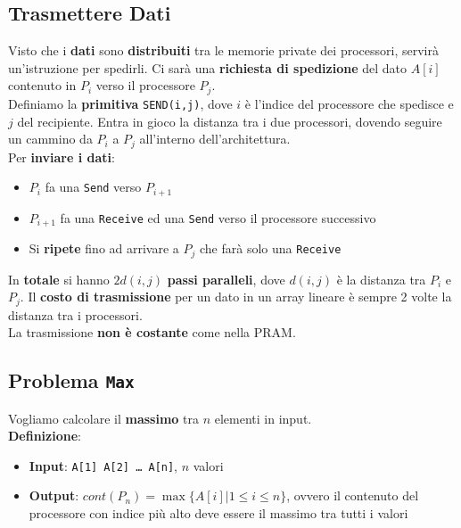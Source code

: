 \newpage

\subsection{Trasmettere Dati}

Visto che i \textbf{dati} sono \textbf{distribuiti} tra le memorie private dei processori, servirà un'istruzione per spedirli. Ci sarà una \textbf{richiesta di spedizione} del dato $A[i]$ contenuto in $P_i$ verso il processore $P_j$. \\

Definiamo la \textbf{primitiva} \texttt{SEND(i,j)}, dove $i$ è l'indice del processore che spedisce e $j$ del recipiente. Entra in gioco la distanza tra i due processori, dovendo seguire un cammino da $P_i$ a $P_j$ all'interno dell'architettura.\\

Per \textbf{inviare i dati}: 
\begin{itemize}
	\item $P_i$ fa una \texttt{Send} verso $P_{i+1}$
	\item $P_{i+1}$ fa una \texttt{Receive} ed una \texttt{Send} verso il processore successivo
	\item Si \textbf{ripete} fino ad arrivare a $P_j$ che farà solo una \texttt{Receive}
\end{itemize}

In \textbf{totale} si hanno $2 d(i,j)$ \textbf{passi paralleli}, dove $d(i,j)$ è la distanza tra $P_i$ e $P_j$. Il \textbf{costo di trasmissione} per un dato in un array lineare è sempre 2 volte la distanza tra i processori.\\

La trasmissione \textbf{non è costante} come nella PRAM.\\

\newpage

\subsection{Problema \texttt{Max}}
Vogliamo calcolare il \textbf{massimo} tra $n$ elementi in input.\\

\textbf{Definizione}: 
\begin{itemize}
	\item \textbf{Input}: \texttt{A[1] A[2] \dots \; A[n]}, $n$ valori
	\item \textbf{Output}: $cont(P_n) = \max\{A[i] | 1 \leq i \leq n\}$, ovvero il contenuto del processore con indice più alto deve essere il massimo tra tutti i valori
\end{itemize}

